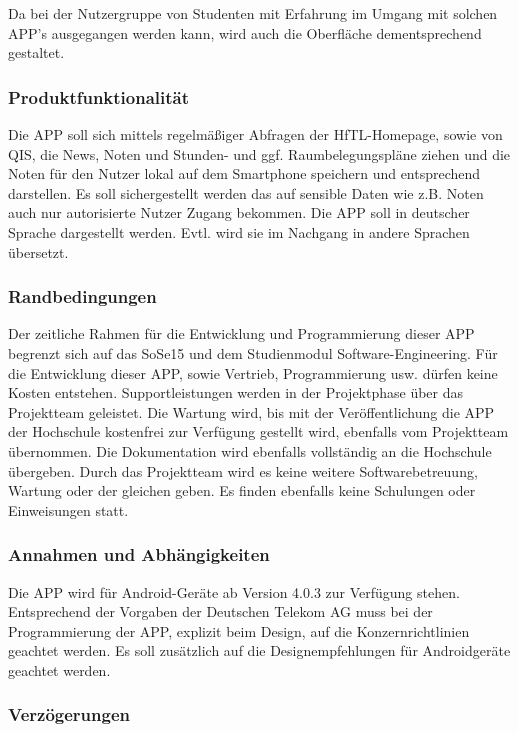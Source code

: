 Da bei der Nutzergruppe von Studenten mit Erfahrung im Umgang mit solchen APP's ausgegangen werden kann, wird auch die Oberfläche dementsprechend gestaltet.

\subsubsection{\textbf{Produktfunktionalität}}

Die APP soll sich mittels regelmäßiger Abfragen der \acs{HfTL}-Homepage, sowie von \acs{QIS}, die News, Noten und Stunden- und ggf. Raumbelegungspläne ziehen und die Noten für den Nutzer lokal auf dem Smartphone speichern und entsprechend darstellen. 
Es soll sichergestellt werden das auf sensible Daten wie z.B. Noten auch nur autorisierte Nutzer Zugang bekommen. Die APP soll in deutscher Sprache dargestellt werden. Evtl. wird sie im Nachgang in andere Sprachen übersetzt. 

\subsubsection{\textbf{Randbedingungen}}

Der zeitliche Rahmen für die Entwicklung und Programmierung dieser APP begrenzt sich auf das \ac{SoSe15} und dem Studienmodul Software-Engineering.
Für die Entwicklung dieser APP, sowie Vertrieb, Programmierung usw. dürfen keine Kosten entstehen.
Supportleistungen werden in der Projektphase über das Projektteam geleistet. Die Wartung wird, bis mit der Veröffentlichung die APP der Hochschule kostenfrei zur Verfügung gestellt wird, ebenfalls vom Projektteam übernommen. Die Dokumentation wird ebenfalls vollständig an die Hochschule übergeben.
Durch das Projektteam wird es keine weitere Softwarebetreuung, Wartung oder der gleichen geben. Es finden ebenfalls keine Schulungen oder Einweisungen statt.

\subsubsection{\textbf{Annahmen und Abhängigkeiten}}

Die APP wird für Android-Geräte ab Version 4.0.3 zur Verfügung stehen.
Entsprechend der Vorgaben der Deutschen Telekom AG muss bei der Programmierung der APP, explizit beim Design, auf die Konzernrichtlinien geachtet werden. Es soll zusätzlich auf die Designempfehlungen für Androidgeräte geachtet werden.

\subsubsection{\textbf{Verzögerungen}}

